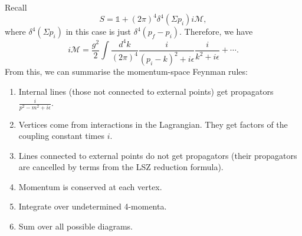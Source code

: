\documentclass[11pt]{article}
\theoremstyle{definition}
\begin{document}
Recall
\begin{equation}
    S = \mathds{1} + (2\pi)^4\delta^4(\Sigma p_i)i\mathcal{M},
\end{equation}
where $\delta^4(\Sigma p_i)$ in this case is just $\delta^4(p_f-p_i)$. Therefore, we have
\begin{equation}
    i\mathcal{M} = \frac{g^2}{2} \int \frac{d^4k}{(2\pi)^4} \frac{i}{(p_i-k)^2+i\epsilon}\frac{i} {k^2+i\epsilon} + \cdots.
\end{equation}
From this, we can summarise the momentum-space Feynman rules:
\begin{shaded}
\begin{enumerate}
    \item Internal lines (those not connected to external points) get propagators $\frac{i}{p^2-m^2+i\epsilon}$.
    \item Vertices come from interactions in the Lagrangian. They get factors of the coupling constant times $i$. 
    \item Lines connected to external points do not get propagators (their propagators are cancelled by terms from the LSZ reduction formula). 
    \item Momentum is conserved at each vertex.
    \item Integrate over undetermined 4-momenta. 
    \item Sum over all possible diagrams.
\end{enumerate}
\end{shaded}
\end{document}
